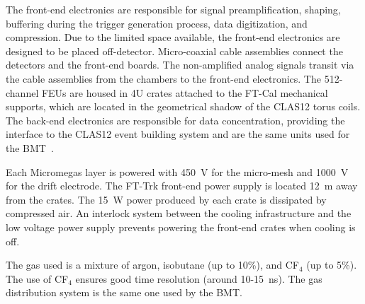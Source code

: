 The front-end electronics are responsible for signal preamplification, shaping, buffering during the trigger generation
process, data digitization, and compression. Due to the limited space available, the front-end electronics are designed
to be placed off-detector. Micro-coaxial cable assemblies connect the detectors and the front-end boards. The
non-amplified analog signals transit via the cable assemblies from the chambers to the front-end electronics. The
512-channel FEUs are housed in 4U crates attached to the FT-Cal mechanical supports, which are located in the
geometrical shadow of the CLAS12 torus coils. The back-end electronics are responsible for data concentration,
providing the interface to the CLAS12 event building system and are the same units used for the BMT~\cite{mm}.

Each Micromegas layer is powered with 450~V for the micro-mesh and 1000~V for the drift electrode. The FT-Trk
front-end power supply is located 12~m away from the crates. The 15~W power produced by each crate is dissipated
by compressed air. An interlock system between the cooling infrastructure and the low voltage power supply prevents
powering the front-end crates when cooling is off. 

The gas used is a mixture of argon, isobutane (up to 10\%), and CF$_4$ (up to 5\%). The use of CF$_4$ ensures 
good time resolution (around 10-15~ns). The gas distribution system is the same one used by the BMT.
